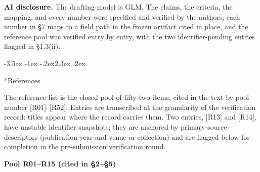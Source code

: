\documentclass[11pt,a4paper]{article}
\makeatletter
\renewcommand\section{\@startsection{section}{1}{\z@}%
  {-3.5ex \@plus -1ex \@minus -.2ex}{2.3ex \@plus .2ex}%
  {\normalfont\Large\bfseries\raggedright}}
\makeatother
\begin{document}
\textbf{AI disclosure.} The drafting model is GLM. The claims, the criteria, the mapping, and every number were specified and verified by the authors; each number in §7 maps to a field path in the frozen artifact cited in place, and the reference pool was verified entry by entry, with the two identifier-pending entries flagged in §1.3(ii).

\section*{References}

The reference list is the closed pool of fifty-two items, cited in the text by pool number [R01]–[R52]. Entries are transcribed at the granularity of the verification record: titles appear where the record carries them. Two entries, [R13] and [R14], have unstable identifier snapshots; they are anchored by primary-source descriptors (publication year and venue or collection) and are flagged below for completion in the pre-submission verification round.

\medskip
\noindent\textbf{Pool R01–R15 (cited in §2–§5)}\par\addvspace{2pt}
\end{document}
